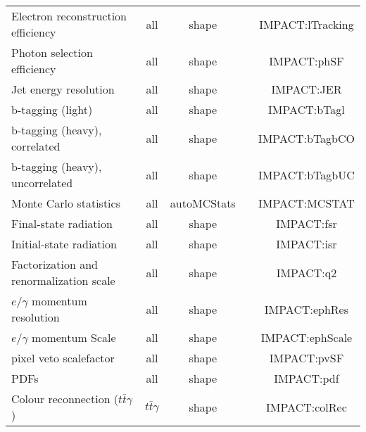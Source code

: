 \begin{table}
\begin{tabular}{l|c|c|c|c}
      Electron reconstruction efficiency                  & all                   & shape             &                     & IMPACT:lTracking  \\
      Photon selection efficiency                         & all                   & shape             &                     & IMPACT:phSF  \\
      Jet energy resolution                               & all                   & shape             &                     & IMPACT:JER  \\
      b-tagging (light)                                   & all                   & shape             &                     & IMPACT:bTagl  \\
      b-tagging (heavy), correlated                       & all                   & shape             &                     & IMPACT:bTagbCO  \\
      b-tagging (heavy), uncorrelated                     & all                   & shape             &                     & IMPACT:bTagbUC  \\
      Monte Carlo statistics                              & all                   & autoMCStats       &                     & IMPACT:MCSTAT  \\
      Final-state radiation                               & all                   & shape             &                     & IMPACT:fsr  \\
      Initial-state radiation                             & all                   & shape             &                     & IMPACT:isr  \\
      Factorization and renormalization scale             & all                   & shape             &                     & IMPACT:q2  \\
      $e/\gamma$ momentum resolution                      & all                   & shape             &                     & IMPACT:ephRes  \\
      $e/\gamma$ momentum Scale                           & all                   & shape             &                     & IMPACT:ephScale  \\
      pixel veto scalefactor                              & all                   & shape             &                     & IMPACT:pvSF  \\
      PDFs                                                & all                   & shape             &                     & IMPACT:pdf  \\
      Colour reconnection ($t\bar{t}\gamma$)              & $t\bar{t}\gamma$      & shape             &                     & IMPACT:colRec  \\

\end{tabular}
\end{table}

